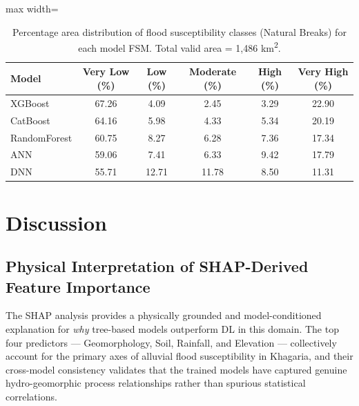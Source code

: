 \documentclass[12pt, a4paper]{article}
\begin{document}
\begin{table}[H]
\centering
\caption{Percentage area distribution of flood susceptibility classes (Natural Breaks) for each model FSM. Total valid area = 1,486 km\textsuperscript{2}.}
\label{tab:area}
\begin{adjustbox}{max width=\linewidth}
\begin{tabular}{lccccc}
\toprule
\textbf{Model} & \textbf{Very Low (\%)} & \textbf{Low (\%)} & \textbf{Moderate (\%)} & \textbf{High (\%)} & \textbf{Very High (\%)} \\
\midrule
XGBoost      & 67.26 & 4.09  & 2.45  & 3.29  & 22.90 \\
CatBoost     & 64.16 & 5.98  & 4.33  & 5.34  & 20.19 \\
RandomForest & 60.75 & 8.27  & 6.28  & 7.36  & 17.34 \\
ANN          & 59.06 & 7.41  & 6.33  & 9.42  & 17.79 \\
DNN          & 55.71 & 12.71 & 11.78 & 8.50  & 11.31 \\
\bottomrule
\end{tabular}
\end{adjustbox}
\end{table}

\section{Discussion}

\subsection{Physical Interpretation of SHAP-Derived Feature Importance}
\label{sec:disc_shap}

The SHAP analysis provides a physically grounded and model-conditioned explanation for \textit{why} tree-based models outperform DL in this domain.  The top four predictors --- Geomorphology, Soil, Rainfall, and Elevation --- collectively account for the primary axes of alluvial flood susceptibility in Khagaria, and their cross-model consistency validates that the trained models have captured genuine hydro-geomorphic process relationships rather than spurious statistical correlations.
\end{document}
